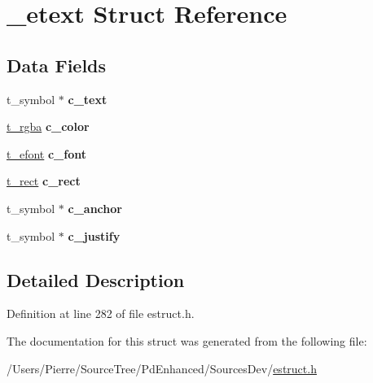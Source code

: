 \hypertarget{struct__etext}{\section{\-\_\-etext Struct Reference}
\label{struct__etext}
}
\subsection*{Data Fields}
\begin{DoxyCompactItemize}
\item 
\hypertarget{struct__etext_ac054c96b035a5f1a859bc8e46b636920}{t\-\_\-symbol $\ast$ {\bfseries c\-\_\-text}}\label{struct__etext_ac054c96b035a5f1a859bc8e46b636920}

\item 
\hypertarget{struct__etext_a8c9f65e6b5d93662d9b40a38b40a3a91}{\hyperlink{struct__rgba}{t\-\_\-rgba} {\bfseries c\-\_\-color}}\label{struct__etext_a8c9f65e6b5d93662d9b40a38b40a3a91}

\item 
\hypertarget{struct__etext_a5a04aa88bfa7e501cc22e79911ec6322}{\hyperlink{struct__efont}{t\-\_\-efont} {\bfseries c\-\_\-font}}\label{struct__etext_a5a04aa88bfa7e501cc22e79911ec6322}

\item 
\hypertarget{struct__etext_a3ad11827ad04fba1ba8cb1d853ad18dc}{\hyperlink{struct__rect}{t\-\_\-rect} {\bfseries c\-\_\-rect}}\label{struct__etext_a3ad11827ad04fba1ba8cb1d853ad18dc}

\item 
\hypertarget{struct__etext_aa5be622725b7ca85ad685a94104ab3fd}{t\-\_\-symbol $\ast$ {\bfseries c\-\_\-anchor}}\label{struct__etext_aa5be622725b7ca85ad685a94104ab3fd}

\item 
\hypertarget{struct__etext_a882eef71064831d5e3671b5a06cd0a1d}{t\-\_\-symbol $\ast$ {\bfseries c\-\_\-justify}}\label{struct__etext_a882eef71064831d5e3671b5a06cd0a1d}

\end{DoxyCompactItemize}


\subsection{Detailed Description}


Definition at line 282 of file estruct.\-h.



The documentation for this struct was generated from the following file\-:\begin{DoxyCompactItemize}
\item 
/\-Users/\-Pierre/\-Source\-Tree/\-Pd\-Enhanced/\-Sources\-Dev/\hyperlink{estruct_8h}{estruct.\-h}\end{DoxyCompactItemize}
